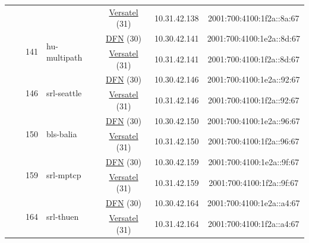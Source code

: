\begin{small}
\begin{center}
\begin{longtable}{|c|c|c|c|c|c|c|c|}
  &  &  &  & \multicolumn{2}{|c|}{\tiny{\href{http://www.versatel.de}{Versatel} (31)}} & \tiny{10.31.42.138} & \tiny{2001:700:4100:1f2a::8a:67} \\* \cline{3-3}\cline{4-4}\cline{5-5}\cline{6-6}\cline{7-7}\cline{8-8}
  &  & \multirow{2}{*}{\tiny{141}} & \multicolumn{1}{|l|}{\multirow{2}{*}{\tiny{hu-multipath}}} & \multicolumn{2}{|c|}{\tiny{\href{https://www.dfn.de}{DFN} (30)}} & \tiny{10.30.42.141} & \tiny{2001:700:4100:1e2a::8d:67} \\* \cline{5-5}\cline{6-6}\cline{7-7}\cline{8-8}
  &  &  &  & \multicolumn{2}{|c|}{\tiny{\href{http://www.versatel.de}{Versatel} (31)}} & \tiny{10.31.42.141} & \tiny{2001:700:4100:1f2a::8d:67} \\* \cline{3-3}\cline{4-4}\cline{5-5}\cline{6-6}\cline{7-7}\cline{8-8}
  &  & \multirow{2}{*}{\tiny{146}} & \multicolumn{1}{|l|}{\multirow{2}{*}{\tiny{srl-seattle}}} & \multicolumn{2}{|c|}{\tiny{\href{https://www.dfn.de}{DFN} (30)}} & \tiny{10.30.42.146} & \tiny{2001:700:4100:1e2a::92:67} \\* \cline{5-5}\cline{6-6}\cline{7-7}\cline{8-8}
  &  &  &  & \multicolumn{2}{|c|}{\tiny{\href{http://www.versatel.de}{Versatel} (31)}} & \tiny{10.31.42.146} & \tiny{2001:700:4100:1f2a::92:67} \\* \cline{3-3}\cline{4-4}\cline{5-5}\cline{6-6}\cline{7-7}\cline{8-8}
  &  & \multirow{2}{*}{\tiny{150}} & \multicolumn{1}{|l|}{\multirow{2}{*}{\tiny{bls-balia}}} & \multicolumn{2}{|c|}{\tiny{\href{https://www.dfn.de}{DFN} (30)}} & \tiny{10.30.42.150} & \tiny{2001:700:4100:1e2a::96:67} \\* \cline{5-5}\cline{6-6}\cline{7-7}\cline{8-8}
  &  &  &  & \multicolumn{2}{|c|}{\tiny{\href{http://www.versatel.de}{Versatel} (31)}} & \tiny{10.31.42.150} & \tiny{2001:700:4100:1f2a::96:67} \\* \cline{3-3}\cline{4-4}\cline{5-5}\cline{6-6}\cline{7-7}\cline{8-8}
  &  & \multirow{2}{*}{\tiny{159}} & \multicolumn{1}{|l|}{\multirow{2}{*}{\tiny{srl-mptcp}}} & \multicolumn{2}{|c|}{\tiny{\href{https://www.dfn.de}{DFN} (30)}} & \tiny{10.30.42.159} & \tiny{2001:700:4100:1e2a::9f:67} \\* \cline{5-5}\cline{6-6}\cline{7-7}\cline{8-8}
  &  &  &  & \multicolumn{2}{|c|}{\tiny{\href{http://www.versatel.de}{Versatel} (31)}} & \tiny{10.31.42.159} & \tiny{2001:700:4100:1f2a::9f:67} \\* \cline{3-3}\cline{4-4}\cline{5-5}\cline{6-6}\cline{7-7}\cline{8-8}
  &  & \multirow{2}{*}{\tiny{164}} & \multicolumn{1}{|l|}{\multirow{2}{*}{\tiny{srl-thuen}}} & \multicolumn{2}{|c|}{\tiny{\href{https://www.dfn.de}{DFN} (30)}} & \tiny{10.30.42.164} & \tiny{2001:700:4100:1e2a::a4:67} \\* \cline{5-5}\cline{6-6}\cline{7-7}\cline{8-8}
  &  &  &  & \multicolumn{2}{|c|}{\tiny{\href{http://www.versatel.de}{Versatel} (31)}} & \tiny{10.31.42.164} & \tiny{2001:700:4100:1f2a::a4:67} \\ \hline
\end{longtable}
\end{center}
\end{small}



